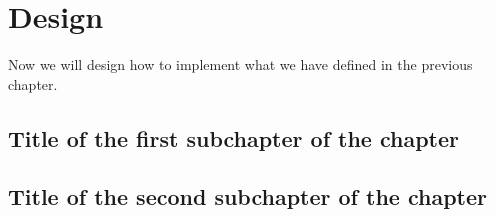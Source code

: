\chapter{Design}

Now we will design how to implement what we have defined in the previous chapter.

\section{Title of the first subchapter of the chapter}

\section{Title of the second subchapter of the chapter}
